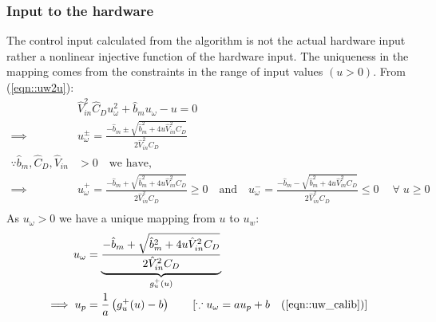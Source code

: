 \subsubsection{Input to the hardware}
The control input calculated from the algorithm is not the actual hardware
input rather a nonlinear injective function of the hardware input. The
uniqueness in the mapping comes from the constraints in the range of input
values $(u > 0)$. From (\ref{eqn::uw2u}):
\begin{align*}
    &\hat V_{in}^2 \hat C_D u_{\omega}^2 + \hat b_m u_\omega - u = 0\\
    \implies& u^{\pm}_\omega = \frac{-\hat b_m \pm \sqrt{\hat b_m ^2 + 4u \hat V_{in}^2 C_D}}{2 \hat V_{in}^2 C_D}\\
    \because \hat b_m, \hat C_D, \hat V_{in} &> 0 \quad \text{we have, }\qquad \\
    \implies& u^{+}_\omega = \frac{-\hat b_m + \sqrt{\hat b_m ^2 + 4u \hat V_{in}^2 C_D}}{2 \hat V_{in}^2 C_D} \geq 0 \quad \text{and} \quad
    u^{-}_\omega = \frac{-\hat b_m - \sqrt{\hat b_m ^2 + 4u \hat V_{in}^2 C_D}}{2 \hat V_{in}^2 C_D} \leq 0 \quad \
    \forall \; u \geq 0 \\
\end{align*}
As $u_\omega > 0$ we have a unique mapping from $u$ to $u_w$:
\begin{align}
    u_\omega &= \underbrace{\frac{-\hat b_m + \sqrt{\hat b_m ^2 + 4u \hat V_{in}^2 C_D}}{2 \hat V_{in}^2 C_D}}_{g_u^+(u)}
    \label{eqn::u2uw}\\
    \implies u_p &= \frac{1}{a} \left( g_u^+(u) - b \right) \qquad [\because u_\omega = a u_p + b \quad (\ref{eqn::uw_calib})]
\end{align}
